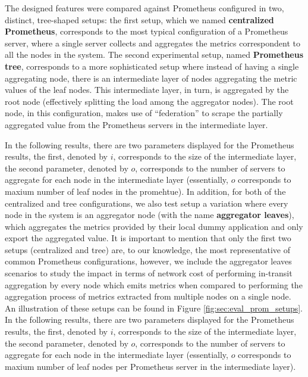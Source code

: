 The designed features were compared against Prometheus configured in two, distinct, tree-shaped setups: the first setup, which we named \textbf{centralized Prometheus}, corresponds to the most typical configuration of a Prometheus server, where a single server collects and aggregates the metrics correspondent to all the nodes in the system. The second experimental setup, named \textbf{Prometheus tree}, corresponds to a more sophisticated setup where instead of having a single aggregating node, there is an intermediate layer of nodes aggregating the metric values of the leaf nodes. This intermediate layer, in turn, is aggregated by the root node (effectively splitting the load among the aggregator nodes). The root node, in this configuration, makes use of ``federation'' to scrape the partially aggregated value from the Prometheus servers in the intermediate layer.

In the following results, there are two parameters displayed for the Prometheus results, the first, denoted by $i$, corresponds to the size of the intermediate layer, the second parameter, denoted by $o$, corresponds to the number of servers to aggregate for each node in the intermediate layer (essentially, $o$ corresponds to maxium number of leaf nodes in the promehtue). In addition, for both of the centralized and tree configurations, we also test setup a variation where every node in the system is an aggregator node (with the name \textbf{aggregator leaves}), which aggregates the metrics provided by their local dummy application and only export the aggregated value. It is important to mention that only the first two setups (centralized and tree) are, to our knowledge, the most representative of common Prometheus configurations, however, we include the aggregator leaves scenarios to study the impact in terms of network cost of performing in-transit aggregation by every node which emits metrics when compared to performing the aggregation process of metrics extracted from multiple nodes on a single node. An illustration of these setups can be found in Figure \ref{fig:sec:eval_prom_setups}.
In the following results, there are two parameters displayed for the Prometheus results, the first, denoted by $i$, corresponds to the size of the intermediate layer, the second parameter, denoted by $o$, corresponds to the number of servers to aggregate for each node in the intermediate layer (essentially, $o$ corresponds to maxium number of leaf nodes per  Prometheus server in the intermediate layer).

